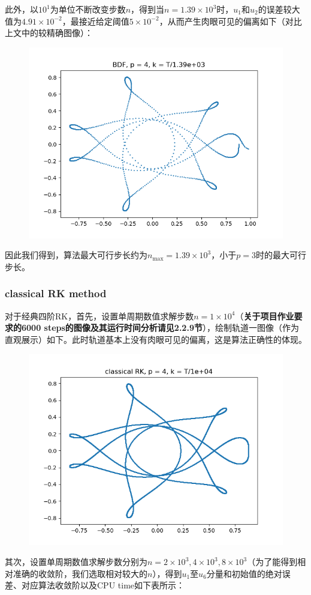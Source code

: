 \documentclass{ctexart}
\begin{document}
\begin{sloppypar}
此外，以$10^1$为单位不断改变步数$n$，得到当$n = 1.39 \times 10^3$时，$u_1$和$u_2$的误差较大值为$4.91 \times 10^{-2}$，最接近给定阈值$5 \times 10^{-2}$，从而产生肉眼可见的偏离如下（对比上文中的较精确图像）：
\begin{figure}[H]
\centering
\includegraphics[scale = 0.45]{./report_src/Figure_63.png}
\end{figure}
因此我们得到，算法最大可行步长约为$n_{\max} = 1.39 \times 10^3$，小于$p=3$时的最大可行步长。

\subsubsection{classical RK method}
对于经典四阶RK，首先，设置单周期数值求解步数$n = 1 \times 10^4$（\textbf{关于项目作业要求的6000 steps的图像及其运行时间分析请见2.2.9节}），绘制轨道一图像（作为直观展示）如下。此时轨道基本上没有肉眼可见的偏离，这是算法正确性的体现。
\begin{figure}[H]
\centering
\includegraphics[scale = 0.45]{./report_src/Figure_64.png}
\end{figure}
其次，设置单周期数值求解步数分别为$n = 2 \times 10^3,4 \times 10^3,8 \times 10^3$（为了能得到相对准确的收敛阶，我们选取相对较大的$n$），得到$u_1$至$u_6$分量和初始值的绝对误差、对应算法收敛阶以及CPU time如下表所示：


\end{sloppypar}
\end{document}
